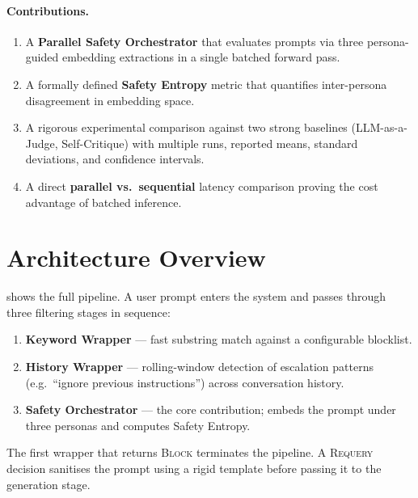 \documentclass[12pt,a4paper]{article}
\begin{document}
\paragraph{Contributions.}
\begin{enumerate}[nosep]
  \item A \textbf{Parallel Safety Orchestrator} that evaluates prompts
        via three persona-guided embedding extractions in a single
        batched forward pass.
  \item A formally defined \textbf{Safety Entropy} metric that
        quantifies inter-persona disagreement in embedding space.
  \item A rigorous experimental comparison against two strong baselines
        (LLM-as-a-Judge, Self-Critique) with multiple runs, reported
        means, standard deviations, and confidence intervals.
  \item A direct \textbf{parallel vs.\ sequential} latency comparison
        proving the cost advantage of batched inference.
\end{enumerate}

\section{Architecture Overview}
\label{sec:architecture}

 shows the full pipeline.  A user prompt enters
the system and passes through three filtering stages in sequence:

\begin{enumerate}[nosep]
  \item \textbf{Keyword Wrapper} --- fast substring match against a
        configurable blocklist.
  \item \textbf{History Wrapper} --- rolling-window detection of
        escalation patterns (e.g.\ ``ignore previous instructions'')
        across conversation history.
  \item \textbf{Safety Orchestrator} --- the core contribution; embeds
        the prompt under three personas and computes Safety Entropy.
\end{enumerate}

The first wrapper that returns \textsc{Block} terminates the pipeline.
A \textsc{Requery} decision sanitises the prompt using a rigid template
before passing it to the generation stage.
\end{document}
